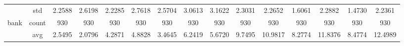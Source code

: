 \begin{table}[htbp]
{\begin{tabular}{rcccc|c|c|c|c|c|ccccc}
			                                                                               & std                                    & 2.2588                                                                             & 2.6198                                                                    & 2.2285                                                                    & 2.7618                                         & 2.5704                                                                    & 3.0613                                       & 3.1622                                      & 2.3031                                         & 2.2652                                         & 1.6061                                          & 2.2882                                          & 1.4730                                         & 2.2361                                         \\
			bank                                                                           & count                                  & 930                                                                                & 930                                                                       & 930                                                                       & 930                                            & 930                                                                       & 930                                          & 930                                         & 930                                            & 930                                            & 930                                             & 930                                             & 930                                            & 930                                            \\
			                                                                               & avg                                    & 2.5495                                                                             & \cellcolor[rgb]{ .776,  .937,  .808}\textcolor[rgb]{ 0,  .38,  0}{2.0796} & 4.2871                                                                    & 4.8828                                         & 3.4645                                                                    & 6.2419                                       & 5.6720                                      & 9.7495                                         & 10.9817                                        & 8.2774                                          & 11.8376                                         & 8.4774                                         & 12.4989                                        \\

\end{tabular}}
\end{table}
